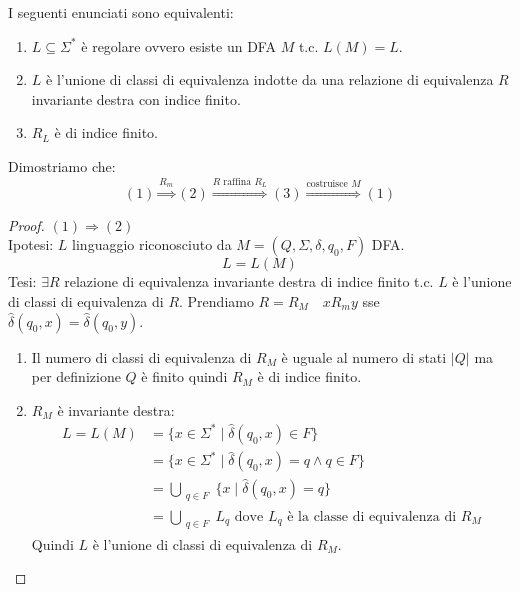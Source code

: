 \documentclass[a4paper]{article}
\begin{document}
{
  I seguenti enunciati sono equivalenti:
  \begin{enumerate}
    \item $L \subseteq \Sigma^*$ è regolare ovvero esiste un DFA $M$ t.c. $L(M) = L$.
    \item $L$ è l'unione di classi di equivalenza indotte da una relazione di equivalenza $R$ 
    invariante destra con indice finito.
    \item $R_L$ è di indice finito.
  \end{enumerate}
}
Dimostriamo che:
\[(1) \stackrel{R_m}{\Longrightarrow} (2) \stackrel{R \text{ raffina } R_L}{\Longrightarrow} (3) \stackrel{\text{costruisce } M}{\Longrightarrow} (1)\]
\begin{proof}
  $(1) \Rightarrow (2)$\\
  Ipotesi: $L$ linguaggio riconosciuto da $M = (Q, \Sigma, \delta, q_0, F)$ DFA. 
  \[L = L(M)\]
  Tesi: $\exists R$ relazione di equivalenza invariante destra di indice finito t.c. $L$ è l'unione di classi di equivalenza di $R$. 
  Prendiamo $R = R_M \quad xR_my$ sse $\hat{\delta}(q_0, x) = \hat{\delta}(q_0,y)$.
  \begin{enumerate}
    \item Il numero di classi di equivalenza di $R_M$ è uguale al numero di stati $|Q|$ ma 
    per definizione $Q$ è finito quindi $R_M$ è di indice finito.
    \item $R_M$ è invariante destra:
    \[
    \begin{aligned}
      L = L(M) &= \{x \in \Sigma^* \; | \; \hat{\delta}(q_0, x) \in F\}\\
      &= \{x \in \Sigma^* \; | \; \hat{\delta}(q_0,x) = q \wedge q \in F\}\\
      &= \bigcup_{\substack{q \in F}} \{x \; | \; \hat{\delta}(q_0, x) = q\}\\
      &= \bigcup_{\substack{q \in F}} L_q \text{ dove } L_q \text{ è la classe di equivalenza di } R_M
    \end{aligned}
    \]
    Quindi $L$ è l'unione di classi di equivalenza di $R_M$.
  \end{enumerate}
\end{proof}
\end{document}
